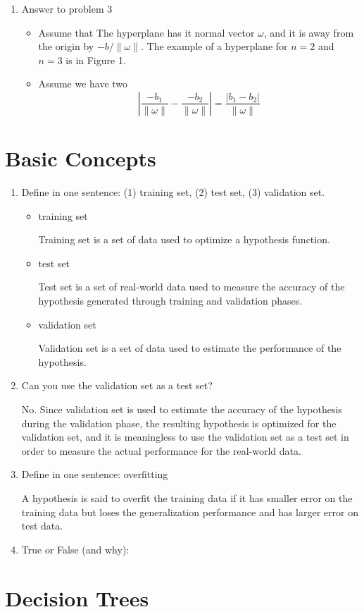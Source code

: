\begin{enumerate}
\item Answer to problem 3
\begin{itemize}
\item Assume that
The hyperplane has it normal vector $\omega$, and it is away from the origin by $-b/\|\omega\|$. The example of a hyperplane for $n=2$ and $n=3$ is in Figure 1.

\item Assume we have two
\[
\left|\frac{-b_1}{\|\omega\|}-\frac{-b_2}{\|\omega\|}\right|=\frac{|b_1-b_2|}{\|\omega\|}
\]
\end{itemize}
\end{enumerate}

\section{Basic Concepts}
\begin{enumerate}
\item Define in one sentence: (1) training set, (2) test set, (3) validation set.
\begin{itemize}
\item training set

Training set is a set of data used to optimize a hypothesis function.

\item test set

Test set is a set of real-world data used to measure the accuracy of the hypothesis generated through training and validation phases.

\item validation set

Validation set is a set of data used to estimate the performance of the hypothesis.

\end{itemize}

\item Can you use the validation set as a test set?

No. Since validation set is used to estimate the accuracy of the hypothesis during the validation phase, the resulting hypothesis is optimized for the validation set, and it is meaningless to use the validation set as a test set in order to measure the actual performance for the real-world data.

\item Define in one sentence: overfitting

A hypothesis is said to overfit the training data if it has smaller error on the training data but loses the generalization performance and has larger error on test data. 

\item True or False (and why):

\end{enumerate}

\section{Decision Trees}



